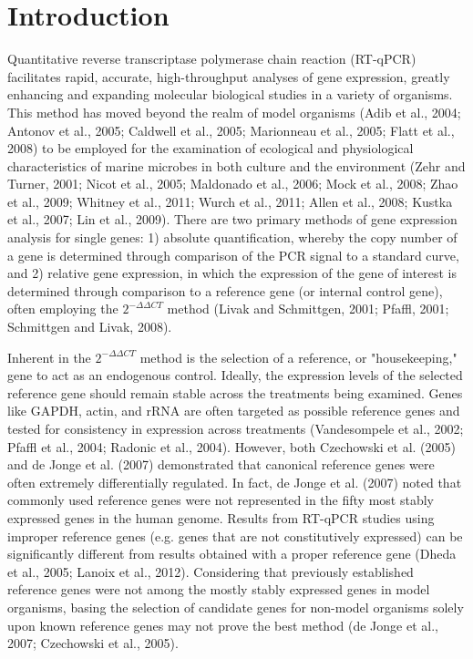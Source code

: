 \section{Introduction}
Quantitative reverse transcriptase polymerase chain reaction (RT-qPCR) facilitates rapid, accurate, high-throughput analyses of gene expression, greatly enhancing and expanding molecular biological studies in a variety of organisms. This method has moved beyond the realm of model organisms (Adib et al., 2004; Antonov et al., 2005; Caldwell et al., 2005; Marionneau et al., 2005; Flatt et al., 2008) to be employed for the examination of ecological and physiological characteristics of marine microbes in both culture and the environment (Zehr and Turner, 2001; Nicot et al., 2005; Maldonado et al., 2006; Mock et al., 2008; Zhao et al., 2009; Whitney et al., 2011; Wurch et al., 2011; Allen et al., 2008; Kustka et al., 2007; Lin et al., 2009). There are two primary methods of gene expression analysis for single genes: 1) absolute quantification, whereby the copy number of a gene is determined through comparison of the PCR signal to a standard curve, and 2) relative gene expression, in which the expression of the gene of interest is determined through comparison to a reference gene (or internal control gene), often employing the  $2^{- \Delta \Delta CT}$ method (Livak and Schmittgen, 2001; Pfaffl, 2001; Schmittgen and Livak, 2008). \par
Inherent in the $2^{- \Delta \Delta CT}$ method is the selection of a reference, or "housekeeping," gene to act as an endogenous control. Ideally, the expression levels of the selected reference gene should remain stable across the treatments being examined. Genes like GAPDH, actin, and rRNA are often targeted as possible reference genes and tested for consistency in expression across treatments (Vandesompele et al., 2002; Pfaffl et al., 2004; Radonic et al., 2004). However, both Czechowski et al. (2005) and de Jonge et al. (2007) demonstrated that canonical reference genes were often extremely differentially regulated. In fact, de Jonge et al. (2007) noted that commonly used reference genes were not represented in the fifty most stably expressed genes in the human genome. Results from RT-qPCR studies using improper reference genes (e.g. genes that are not constitutively expressed) can be significantly different from results obtained with a proper reference gene (Dheda et al., 2005; Lanoix et al., 2012). Considering that previously established reference genes were not among the mostly stably expressed genes in model organisms, basing the selection of candidate genes for non-model organisms solely upon known reference genes may not prove the best method (de Jonge et al., 2007; Czechowski et al., 2005). \par
